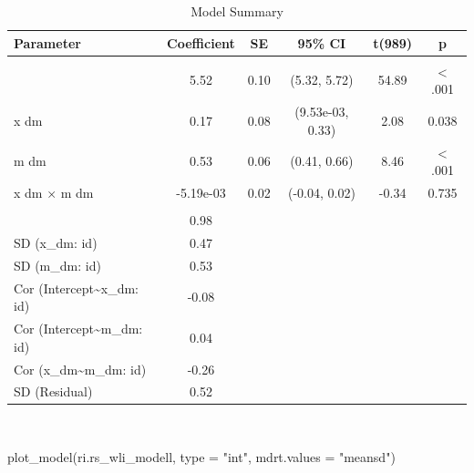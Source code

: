 \documentclass[
  letterpaper,
  DIV=11,
  numbers=noendperiod]{scrreprt}
\newenvironment{Shaded}{\begin{snugshade}}{\end{snugshade}}
\newcommand{\AttributeTok}[1]{\textcolor[rgb]{0.40,0.45,0.13}{#1}}
\newcommand{\FunctionTok}[1]{\textcolor[rgb]{0.28,0.35,0.67}{#1}}
\newcommand{\NormalTok}[1]{\textcolor[rgb]{0.00,0.23,0.31}{#1}}
\newcommand{\StringTok}[1]{\textcolor[rgb]{0.13,0.47,0.30}{#1}}
\begin{document}
\begin{table}
\caption*{
{\large Model Summary}
} 
\fontsize{12.0pt}{14.4pt}\selectfont
\begin{tabular*}{\linewidth}{@{\extracolsep{\fill}}lccccc}
\toprule
Parameter & Coefficient & SE & 95\% CI & t(989) & p \\ 
\midrule\addlinespace[2.5pt]
\multicolumn{6}{l}{{\slshape Fixed Effects }} \\[2.5pt] 
\midrule\addlinespace[2.5pt]
{(Intercept)} & 5.52 & 0.10 & (5.32, 5.72) & 54.89 & < .001 \\ 
{x dm} & 0.17 & 0.08 & (9.53e-03, 0.33) & 2.08 & 0.038  \\ 
{m dm} & 0.53 & 0.06 & (0.41, 0.66) & 8.46 & < .001 \\ 
{x dm × m dm} & -5.19e-03 & 0.02 & (-0.04, 0.02) & -0.34 & 0.735  \\ 
\midrule\addlinespace[2.5pt]
\multicolumn{6}{l}{{\slshape Random Effects }} \\[2.5pt] 
\midrule\addlinespace[2.5pt]
{SD (Intercept: id)} & 0.98 &  &  &  &  \\ 
{SD (x\_dm: id)} & 0.47 &  &  &  &  \\ 
{SD (m\_dm: id)} & 0.53 &  &  &  &  \\ 
{Cor (Intercept\textasciitilde{}x\_dm: id)} & -0.08 &  &  &  &  \\ 
{Cor (Intercept\textasciitilde{}m\_dm: id)} & 0.04 &  &  &  &  \\ 
{Cor (x\_dm\textasciitilde{}m\_dm: id)} & -0.26 &  &  &  &  \\ 
{SD (Residual)} & 0.52 &  &  &  &  \\ 
\bottomrule
\end{tabular*}
\begin{minipage}{\linewidth}
\\
\end{minipage}
\end{table}

\begin{Shaded}
\begin{Highlighting}[]
\FunctionTok{plot\_model}\NormalTok{(ri.rs\_wli\_modell, }\AttributeTok{type =} \StringTok{"int"}\NormalTok{, }\AttributeTok{mdrt.values =} \StringTok{"meansd"}\NormalTok{)}
\end{Highlighting}
\end{Shaded}
\end{document}
